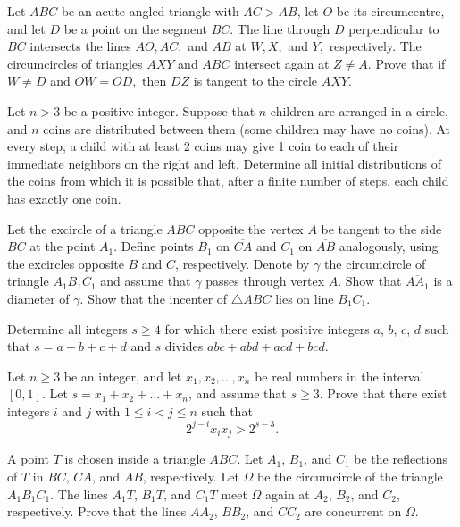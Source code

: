 \documentclass[11pt]{scrartcl}
\begin{document}
\begin{problem}[282712203118607]
	Let $ABC$ be an acute-angled triangle with $AC > AB$, let $O$ be its circumcentre, and let $D$ be a point on the segment $BC$. The line through $D$ perpendicular to $BC$ intersects the lines $AO, AC,$ and $AB$ at $W, X,$ and $Y,$ respectively. The circumcircles of triangles $AXY$ and $ABC$ intersect again at $Z \ne A$.
Prove that if $W \ne D$ and $OW = OD,$ then $DZ$ is tangent to the circle $AXY.$
\end{problem}
\begin{problem}[931951248564234]
Let $n > 3$ be a positive integer. Suppose that $n$ children are arranged in a circle, and $n$ coins are distributed between them (some children may have no coins). At every step, a child with at least 2 coins may give 1 coin to each of their immediate neighbors on the right and left. Determine all initial distributions of the coins from which it is possible that, after a finite number of steps, each child has exactly one coin.
\end{problem}
\begin{problem}[495587557940069]
Let the excircle of a triangle $ABC$ opposite the vertex $A$ be tangent to the side $BC$ at the point $A_1$. Define points $B_1$ on $\overline{CA}$ and $C_1$ on $\overline{AB}$ analogously, using the excircles opposite $B$ and $C$, respectively. Denote by $\gamma$ the circumcircle of triangle $A_1B_1C_1$ and assume that $\gamma$ passes through vertex $A$.
Show that $\overline{AA_1}$ is a diameter of $\gamma$.
Show that the incenter of $\triangle ABC$ lies on line $B_1C_1$.
\end{problem}
\begin{problem}[211625179383762]
Determine all integers $s \ge 4$ for which there exist positive integers $a$, $b$, $c$, $d$ such that $s = a+b+c+d$ and $s$ divides $abc+abd+acd+bcd$.
\end{problem}
\begin{problem}[7550072974614174968]
Let $n \geqslant 3$ be an integer, and let $x_1,x_2,\ldots,x_n$ be real numbers in the interval $[0,1]$. Let $s=x_1+x_2+\ldots+x_n$, and assume that $s \geqslant 3$. Prove that there exist integers $i$ and $j$ with $1 \leqslant i<j \leqslant n$ such that
\[2^{j-i}x_ix_j>2^{s-3}.\]
\end{problem}
\begin{problem}[2918584823978789760]
A point $T$ is chosen inside a triangle $ABC$. Let $A_1$, $B_1$, and $C_1$ be the reflections of $T$ in $BC$, $CA$, and $AB$, respectively. Let $\Omega$ be the circumcircle of the triangle $A_1B_1C_1$. The lines $A_1T$, $B_1T$, and $C_1T$ meet $\Omega$ again at $A_2$, $B_2$, and $C_2$, respectively. Prove that the lines $AA_2$, $BB_2$, and $CC_2$ are concurrent on $\Omega$.
\end{problem}
\end{document}
